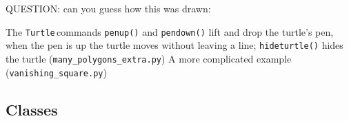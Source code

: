\documentclass[11pt,a4paper]{scrartcl}
\newcommand{\turtle}{\texttt{Turtle}\,}
\begin{document}
QUESTION: can you guess how this was drawn:
\begin{center}
\end{center}
The \turtle commands \texttt{penup()} and \texttt{pendown()} lift and
drop the turtle's pen, when the pen is up the turtle moves without
leaving a line; \texttt{hideturtle()} hides the turtle (\texttt{many\_polygons\_extra.py})
A more complicated example (\texttt{vanishing\_square.py})
\begin{center}
\end{center}

\subsection*{Classes}
\end{document}
